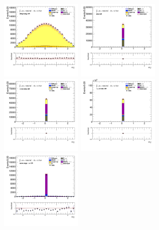 		\begin{figure}[!htp]
			\begin{center}    
			\includegraphics[width=0.35\textwidth]{chapters/chapter6_HPlus/images/taulep/bjet_0_eta_DILEP_BTAG.png}
			\includegraphics[width=0.35\textwidth]{chapters/chapter6_HPlus/images/taulep/bjet_0_eta_ZEE.png} \\
			\includegraphics[width=0.35\textwidth]{chapters/chapter6_HPlus/images/taulep/bjet_0_eta_TAUEL_BVETO.png} 
			\includegraphics[width=0.35\textwidth]{chapters/chapter6_HPlus/images/taulep/bjet_0_eta_TAUMU_BVETO.png} \\
			\includegraphics[width=0.35\textwidth]{chapters/chapter6_HPlus/images/taulep/bjet_0_eta_SS_TAUEL.png} 

\end{center}
\end{figure}
